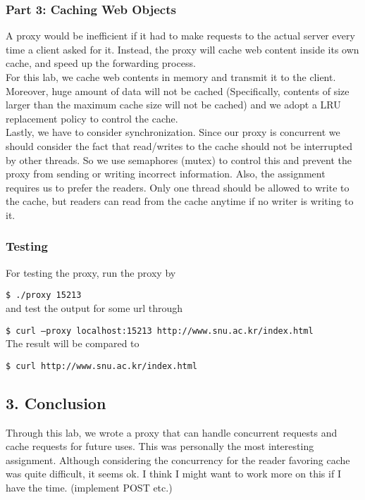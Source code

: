 \documentclass[12pt]{report}
\begin{document}
\subsubsection*{Part 3: Caching Web Objects}
A proxy would be inefficient if it had to make requests to the actual server every time a client asked for it. Instead, the proxy will cache web content inside its own cache, and speed up the forwarding process.\\
For this lab, we cache web contents in memory and transmit it to the client. Moreover, huge amount of data will not be cached (Specifically, contents of size larger than the maximum cache size will not be cached) and we adopt a LRU replacement policy to control the cache.\\
Lastly, we have to consider synchronization. Since our proxy is concurrent we should consider the fact that read/writes to the cache should not be interrupted by other threads. So we use semaphores (mutex) to control this and prevent the proxy from sending or writing incorrect information. Also, the assignment requires us to prefer the readers. Only one thread should be allowed to write to the cache, but readers can read from the cache anytime if no writer is writing to it.
\subsubsection{Testing}
For testing the proxy, run the proxy by

\texttt{\$ ./proxy 15213}\\
and test the output for some url through

\texttt{\$ curl --proxy localhost:15213 http://www.snu.ac.kr/index.html}\\
The result will be compared to

\texttt{\$ curl http://www.snu.ac.kr/index.html}
\subsection*{3. Conclusion}
Through this lab, we wrote a proxy that can handle concurrent requests and cache requests for future uses. This was personally the most interesting assignment. Although considering the concurrency for the reader favoring cache was quite difficult, it seems ok. I think I might want to work more on this if I have the time. (implement POST etc.)
\end{document}
